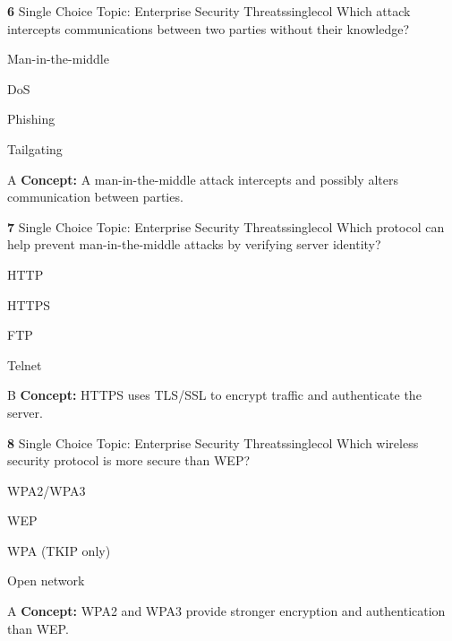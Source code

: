 \documentclass[10pt,a4paper]{article}
\begin{document}
\begin{qcard}{\color{white}\textbf{6} \hfill \small Single Choice \textbar{} Topic: Enterprise Security Threats}{singlecol}
Which attack intercepts communications between two parties without their knowledge?

\begin{qoptions}
\item Man-in-the-middle
\item DoS
\item Phishing
\item Tailgating
\end{qoptions}
\begin{explainbox}{A}
\textbf{Concept:} A man-in-the-middle attack intercepts and possibly alters communication between parties.
\end{explainbox}
\end{qcard}

\begin{qcard}{\color{white}\textbf{7} \hfill \small Single Choice \textbar{} Topic: Enterprise Security Threats}{singlecol}
Which protocol can help prevent man-in-the-middle attacks by verifying server identity?

\begin{qoptions}
\item HTTP
\item HTTPS
\item FTP
\item Telnet
\end{qoptions}
\begin{explainbox}{B}
\textbf{Concept:} HTTPS uses TLS/SSL to encrypt traffic and authenticate the server.
\end{explainbox}
\end{qcard}

\begin{qcard}{\color{white}\textbf{8} \hfill \small Single Choice \textbar{} Topic: Enterprise Security Threats}{singlecol}
Which wireless security protocol is more secure than WEP?

\begin{qoptions}
\item WPA2/WPA3
\item WEP
\item WPA (TKIP only)
\item Open network
\end{qoptions}
\begin{explainbox}{A}
\textbf{Concept:} WPA2 and WPA3 provide stronger encryption and authentication than WEP.
\end{explainbox}
\end{qcard}
\end{document}

